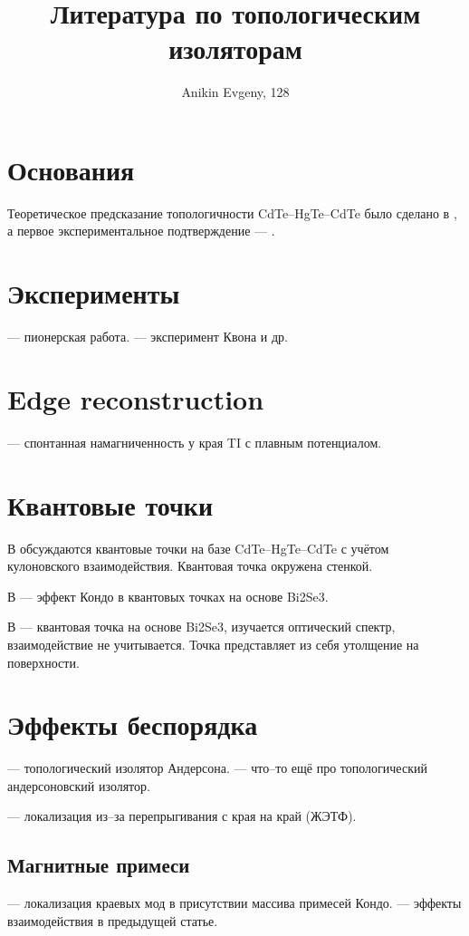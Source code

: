 \documentclass{article}
\title{Литература по топологическим изоляторам}
\author{Anikin Evgeny, 128}
\begin{document}
    \maketitle
    \section{Основания}
    Теоретическое предсказание топологичности CdTe--HgTe--CdTe было сделано в 
    \cite{Bernevig2006}, а первое экспериментальное подтверждение --- \cite{Konig2007}.

    \section{Эксперименты}
    \cite{Konig2007} --- пионерская работа.
    \cite{Gusev2011} --- эксперимент Квона и др.
    \section{Edge reconstruction}
    \cite{Wang2017} --- спонтанная намагниченность у края TI с плавным потенциалом.
    
    \section{Квантовые точки}
    В \cite{Li2014} обсуждаются квантовые точки на базе CdTe--HgTe--CdTe с 
    учётом кулоновского взаимодействия. Квантовая точка окружена стенкой.

    В \cite{Xin2015} --- эффект Кондо в квантовых точках на основе Bi2Se3.

    В \cite{Herath2014} --- квантовая точка на основе Bi2Se3, изучается оптический 
    спектр, взаимодействие не учитывается. Точка представляет из себя утолщение 
    на поверхности.

    \section{Эффекты беспорядка}
    \cite{Li2009} --- топологический изолятор Андерсона.
    \cite{Girschik2015} --- что--то ещё про топологический андерсоновский изолятор. 

    \cite{Entin2015} --- локализация из--за перепрыгивания с края на край (ЖЭТФ).
    \subsection{Магнитные примеси}
    \cite{Altshuler2013} --- локализация краевых мод в присутствии массива примесей Кондо. 
    \cite{Yevtushenko2015} --- эффекты взаимодействия в предыдущей статье.
    
    \newpage
    
\end{document}
